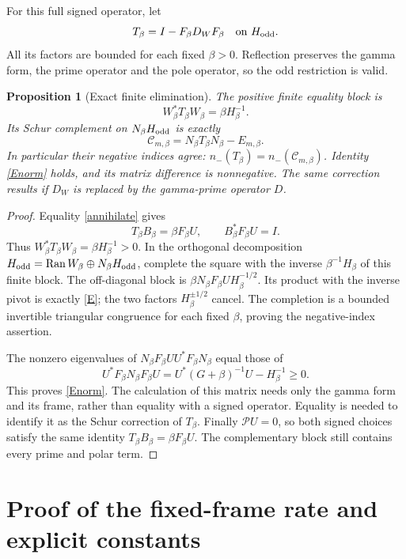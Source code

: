 \documentclass[11pt]{article}
\newtheorem{proposition}[theorem]{Proposition}
\theoremstyle{remark}
\newcommand{\Ran}{\operatorname{Ran}}
\begin{document}
For this full signed operator, let
\begin{equation}\label{T}
 T_\beta=I-F_\beta D_WF_\beta\quad\text{on }H_{\rm odd}.
\end{equation}
All its factors are bounded for each fixed \(\beta>0\).
Reflection preserves the gamma form, the prime operator and the
pole operator, so the odd restriction is valid.

\begin{proposition}[Exact finite elimination]\label{schur}
The positive finite equality block is
\[
 W_\beta^*T_\beta W_\beta=\beta H_\beta^{-1}.
\]
Its Schur complement on \(N_\beta H_{\rm odd}\) is exactly
\begin{equation}\label{complement}
 \mathcal C_{m,\beta}
        =N_\beta T_\beta N_\beta-E_{m,\beta}.
\end{equation}
In particular their negative indices agree:
\(n_-(T_\beta)=n_-(\mathcal C_{m,\beta})\).
Identity \eqref{Enorm} holds, and its matrix difference is
nonnegative. The same correction results if \(D_W\) is replaced
by the gamma-prime operator \(D\).
\end{proposition}
\begin{proof}
Equality \eqref{annihilate} gives
\[
 T_\beta B_\beta=\beta F_\beta U,\qquad
 B_\beta^*F_\beta U=I.
\]
Thus \(W_\beta^*T_\beta W_\beta=\beta H_\beta^{-1}>0\).
In the orthogonal decomposition
\(H_{\rm odd}=\Ran W_\beta\oplus N_\beta H_{\rm odd}\),
complete the square with the inverse
\(\beta^{-1}H_\beta\) of this finite block.
The off-diagonal block is
\(\beta N_\beta F_\beta UH_\beta^{-1/2}\).
Its product with the inverse pivot is exactly \eqref{E};
the two factors \(H_\beta^{\pm1/2}\) cancel.
The completion is a bounded invertible triangular congruence
for each fixed \(\beta\), proving the negative-index assertion.

The nonzero eigenvalues of
\(N_\beta F_\beta UU^*F_\beta N_\beta\) equal those of
\[
 U^*F_\beta N_\beta F_\beta U
    =U^*(G+\beta)^{-1}U-H_\beta^{-1}\ge0.
\]
This proves \eqref{Enorm}. The calculation of this matrix needs
only the gamma form and its frame, rather than equality with a
signed operator. Equality is needed to identify it as the Schur
correction of \(T_\beta\).
Finally \(\mathcal P U=0\), so both signed choices satisfy
the same identity \(T_\beta B_\beta=\beta F_\beta U\).
The complementary block still contains every prime and polar term.
\end{proof}

\section{Proof of the fixed-frame rate and explicit constants}
\end{document}
